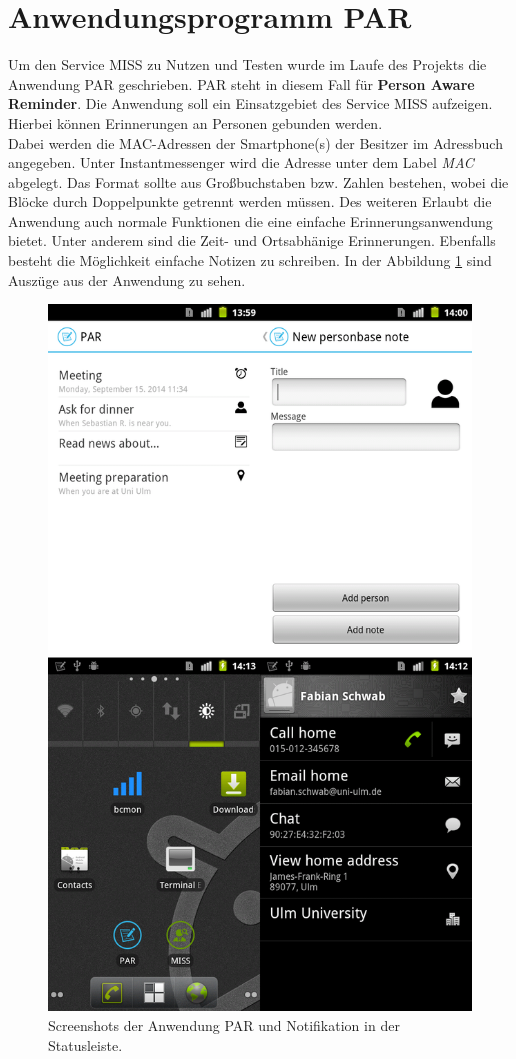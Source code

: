 \documentclass[]{report}
\begin{document}
\section{Anwendungsprogramm PAR}\label{lab:par}
Um den Service MISS zu Nutzen und Testen wurde im Laufe des Projekts die Anwendung PAR geschrieben. PAR steht in diesem Fall für \textbf{Person Aware Reminder}. Die Anwendung soll ein Einsatzgebiet des Service MISS aufzeigen. Hierbei können Erinnerungen an Personen gebunden werden. \\
Dabei werden die MAC-Adressen der Smartphone(s) der Besitzer im Adressbuch angegeben. Unter Instantmessenger wird die Adresse unter dem Label \textit{MAC} abgelegt. Das Format sollte aus Großbuchstaben bzw. Zahlen bestehen, wobei die Blöcke durch Doppelpunkte getrennt werden müssen. Des weiteren Erlaubt die Anwendung auch normale Funktionen die eine einfache Erinnerungsanwendung bietet. Unter anderem sind die Zeit- und Ortsabhänige Erinnerungen. Ebenfalls besteht die Möglichkeit einfache Notizen zu schreiben. In der Abbildung \ref{fig:par} sind Auszüge aus der Anwendung zu sehen. 
\begin{figure}[h!]
    \centering 
    \includegraphics[width=5.0in]{bilder/par.png}
    \caption{Screenshots der Anwendung PAR und Notifikation in der Statusleiste.}
    \label{fig:par}
\end{figure}
\end{document}
